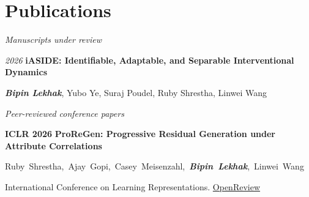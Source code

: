 \documentclass[10pt, letterpaper]{article}
\begin{document}
    \section{Publications}

    \begin{onecolentry}
        \textit{Manuscripts under review}
    \end{onecolentry}

    \vspace{0.10 cm}

    \begin{samepage}
        \begin{twocolentry}{
            \textit{2026}
            }
            \textbf{iASIDE: Identifiable, Adaptable, and Separable Interventional Dynamics}

            \vspace{0.05 cm}

            \textbf{\textit{Bipin Lekhak}}, Yubo Ye, Suraj Poudel, Ruby Shrestha, Linwei Wang
        \end{twocolentry}
    \end{samepage}

    \vspace{0.3 cm}

    \begin{onecolentry}
        \textit{Peer-reviewed conference papers}
    \end{onecolentry}

    \vspace{0.10 cm}

    \begin{samepage}
        \begin{twocolentry}{
            \textbf{ICLR 2026}
            }
            \textbf{ProReGen: Progressive Residual Generation under Attribute Correlations}

            \vspace{0.05 cm}

            \mbox{Ruby Shrestha, Ajay Gopi, Casey Meisenzahl, \textbf{\textit{Bipin Lekhak}}, Linwei Wang}

            \vspace{0.05 cm}

            International Conference on Learning Representations.
            \href{https://openreview.net/forum?id=2LzYaW032Q}{OpenReview}
        \end{twocolentry}
    \end{samepage}
\end{document}
